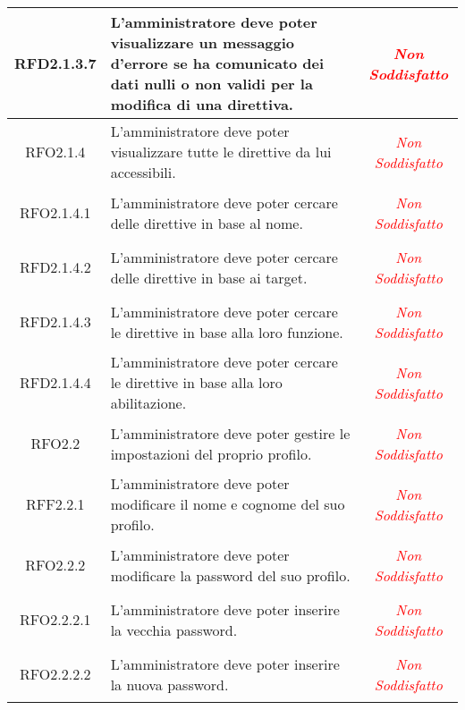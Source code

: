 \begin{longtable}{|c|>{\centering}m{7cm}|c|}
\hypertarget{RFD2.1.3.7}{RFD2.1.3.7} & L'amministratore deve poter visualizzare un messaggio d'errore se ha comunicato dei dati nulli o non validi per la modifica di una direttiva. & \textcolor{red}{\textit{Non Soddisfatto}}\\ \hline

\hypertarget{RFO2.1.4}{RFO2.1.4} & L'amministratore deve poter visualizzare tutte le direttive da lui accessibili. & \textcolor{red}{\textit{Non Soddisfatto}}\\ \hline

\hypertarget{RFO2.1.4.1}{RFO2.1.4.1} & L'amministratore deve poter cercare delle direttive in base al nome. & \textcolor{red}{\textit{Non Soddisfatto}}\\ \hline

\hypertarget{RFD2.1.4.2}{RFD2.1.4.2} & L'amministratore deve poter cercare delle direttive in base ai target. & \textcolor{red}{\textit{Non Soddisfatto}}\\ \hline

\hypertarget{RFD2.1.4.3}{RFD2.1.4.3} & L'amministratore deve poter cercare le direttive in base alla loro funzione. & \textcolor{red}{\textit{Non Soddisfatto}}\\ \hline

\hypertarget{RFD2.1.4.4}{RFD2.1.4.4} & L'amministratore deve poter cercare le direttive in base alla loro abilitazione. & \textcolor{red}{\textit{Non Soddisfatto}}\\ \hline

\hypertarget{RFO2.2}{RFO2.2} & L'amministratore deve poter gestire le impostazioni del proprio profilo. & \textcolor{red}{\textit{Non Soddisfatto}}\\ \hline

\hypertarget{RFF2.2.1}{RFF2.2.1} & L'amministratore deve poter modificare il nome e cognome del suo profilo. & \textcolor{red}{\textit{Non Soddisfatto}}\\ \hline

\hypertarget{RFO2.2.2}{RFO2.2.2} & L'amministratore deve poter modificare la password del suo profilo. & \textcolor{red}{\textit{Non Soddisfatto}}\\ \hline

\hypertarget{RFO2.2.2.1}{RFO2.2.2.1} & L'amministratore deve poter inserire la vecchia password. & \textcolor{red}{\textit{Non Soddisfatto}}\\ \hline

\hypertarget{RFO2.2.2.2}{RFO2.2.2.2} & L'amministratore deve poter inserire la nuova password. & \textcolor{red}{\textit{Non Soddisfatto}}\\ \hline


\end{longtable}
